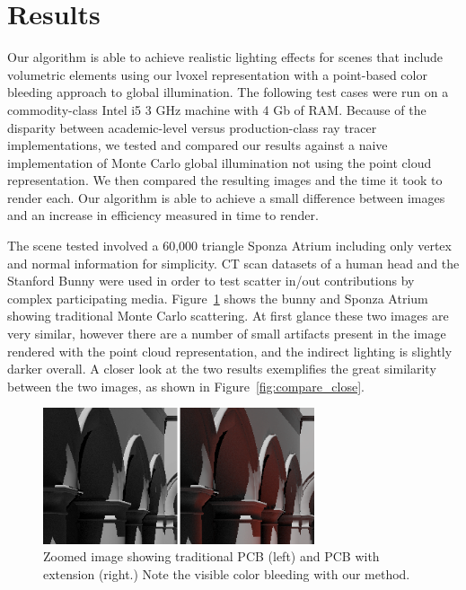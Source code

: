 \documentclass[runningheads]{llncs}
\begin{document}
\section{Results}
Our algorithm is able to achieve realistic lighting effects for scenes that include volumetric elements using our lvoxel representation with a point-based color bleeding approach to global illumination.
The following test cases were run on a commodity-class Intel i5 3 GHz machine with 4 Gb of RAM.  Because of the disparity between academic-level versus production-class ray tracer implementations, we tested and compared our results against a naive implementation of Monte Carlo global illumination not using the point cloud representation.  We then compared the resulting images and the time it took to render each.  Our algorithm is able to achieve a small difference between images and an increase in efficiency measured in time to render.

The scene tested involved a 60,000 triangle Sponza Atrium including only vertex and normal information for simplicity.  CT scan datasets of a human head and the Stanford Bunny were used in order to test scatter in/out contributions by complex participating media.
Figure~\ref{fig:compare_trad} shows the bunny and Sponza Atrium showing traditional Monte Carlo scattering.  At first glance these two images are very similar, however there are a number of small artifacts present in the image rendered with the point cloud representation, and the indirect lighting is slightly darker overall.  A closer look at the two results exemplifies the great similarity between the two images, as shown in Figure~\ref{fig:compare_close}.

\begin{figure}[h!]
    \centering
    \includegraphics[width=80mm]{img/compare_trad_corrected.png}
    \caption{Zoomed image showing traditional PCB (left) and PCB with extension (right.)  Note the visible color bleeding with our method.}
    \label{fig:compare_trad}
\end{figure}
\end{document}
